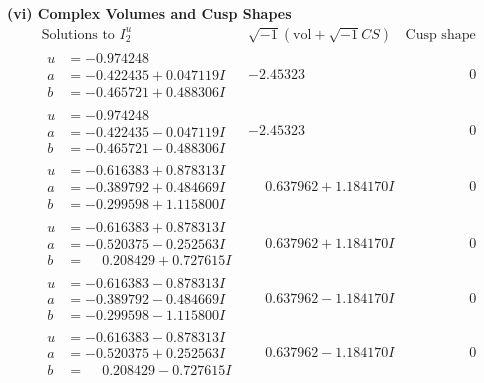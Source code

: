 \documentclass[1p]{elsarticle_modified}
\theoremstyle{definition}
\newcommand{\I}{\sqrt{-1}}
\begin{document}
\newpage\flushleft \textbf{(vi) Complex Volumes and Cusp Shapes}
$$\begin{array}{c|c|c}  
\text{Solutions to }I^u_{2}& \I (\text{vol} + \sqrt{-1}CS) & \text{Cusp shape}\\
 \hline 
\begin{aligned}
u &= -0.974248\phantom{ +0.000000I} \\
a &= -0.422435 + 0.047119 I \\
b &= -0.465721 + 0.488306 I\end{aligned}
 & -2.45323\phantom{ +0.000000I} & \phantom{-0.000000 } 0 \\ \hline\begin{aligned}
u &= -0.974248\phantom{ +0.000000I} \\
a &= -0.422435 - 0.047119 I \\
b &= -0.465721 - 0.488306 I\end{aligned}
 & -2.45323\phantom{ +0.000000I} & \phantom{-0.000000 } 0 \\ \hline\begin{aligned}
u &= -0.616383 + 0.878313 I \\
a &= -0.389792 + 0.484669 I \\
b &= -0.299598 + 1.115800 I\end{aligned}
 & \phantom{-}0.637962 + 1.184170 I & \phantom{-0.000000 } 0 \\ \hline\begin{aligned}
u &= -0.616383 + 0.878313 I \\
a &= -0.520375 - 0.252563 I \\
b &= \phantom{-}0.208429 + 0.727615 I\end{aligned}
 & \phantom{-}0.637962 + 1.184170 I & \phantom{-0.000000 } 0 \\ \hline\begin{aligned}
u &= -0.616383 - 0.878313 I \\
a &= -0.389792 - 0.484669 I \\
b &= -0.299598 - 1.115800 I\end{aligned}
 & \phantom{-}0.637962 - 1.184170 I & \phantom{-0.000000 } 0 \\ \hline\begin{aligned}
u &= -0.616383 - 0.878313 I \\
a &= -0.520375 + 0.252563 I \\
b &= \phantom{-}0.208429 - 0.727615 I\end{aligned}
 & \phantom{-}0.637962 - 1.184170 I & \phantom{-0.000000 } 0 \\ \hline\begin{aligned}

\end{aligned}
\end{array}$$
\end{document}
